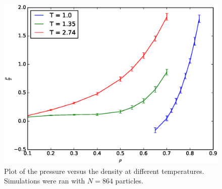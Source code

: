 \documentclass[twoside]{article}
\begin{document}
\begin{figure}[h]
\centering
\includegraphics[width=0.6\linewidth]{fig/figure_pressure}
\caption{Plot of the pressure versus the density at different temperatures. Simulations were ran with $N=864$ particles.}
\label{fig:figure_pressure}
\end{figure}
\end{document}

